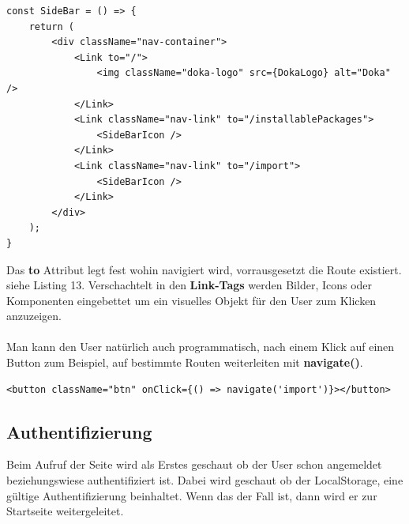 \begin{lstlisting}[caption=Beispiel für Navigation in React]
  const SideBar = () => {
    return (
        <div className="nav-container">
            <Link to="/">
                <img className="doka-logo" src={DokaLogo} alt="Doka" />
            </Link>
            <Link className="nav-link" to="/installablePackages">
                <SideBarIcon />
            </Link>
            <Link className="nav-link" to="/import">
                <SideBarIcon />
            </Link>
        </div>
    );
}
\end{lstlisting}

Das \textbf{to} Attribut legt fest wohin navigiert wird, vorrausgesetzt die Route existiert. siehe Listing 13.
Verschachtelt in den \textbf{Link-Tags} werden Bilder, Icons oder Komponenten eingebettet um ein visuelles Objekt für den User 
zum Klicken anzuzeigen.
\\
\\
Man kann den User natürlich auch programmatisch, nach einem Klick auf einen Button zum Beispiel, auf bestimmte Routen weiterleiten 
mit \textbf{navigate()}.

\begin{lstlisting}[caption=Alternative Navigation]
  <button className="btn" onClick={() => navigate('import')}></button>
\end{lstlisting}
\cite{APCW20020}

\clearpage

\subsection{Authentifizierung}
Beim Aufruf der Seite wird als Erstes geschaut ob der User schon angemeldet beziehungswiese authentifiziert ist.
Dabei wird geschaut ob der LocalStorage, eine gültige Authentifizierung beinhaltet.
Wenn das der Fall ist, dann wird er zur Startseite weitergeleitet. 

